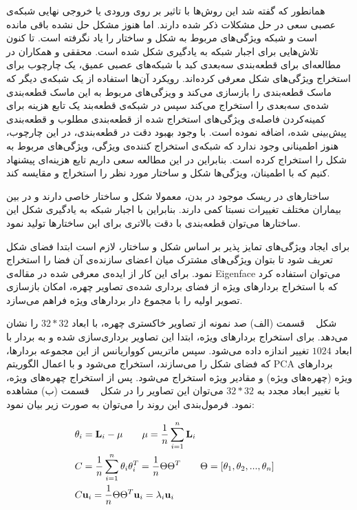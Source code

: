همانطور که گفته شد این روش‌ها با تاثیر بر روی ورودی یا خروجی نهایی شبکه‌ی عصبی سعی در حل مشکلات ذکر شده دارند. اما هنوز مشکل حل نشده باقی مانده است و شبکه ویژگی‌های مربوط به شکل و ساختار را یاد نگرفته است. تا کنون تلاش‌هایی برای اجبار شبکه به یادگیری شکل شده است. محققی و همکاران  در مطالعه‌ای برای قطعه‌بندی سه‌بعدی کبد با شبکه‌های عصبی عمیق، یک چارچوب برای استخراج ویژگی‌های شکل معرفی کرده‌اند. رویکرد آن‌ها استفاده از یک شبکه‌ی دیگر که ماسک قطعه‌بندی را بازسازی می‌کند و ویزگی‌های مربوط به این ماسک قطعه‌بندی شده‌ی سه‌بعدی را استخراج می‌کند سپس در شبکه‌ی قطعه‌بند یک تابع هزینه برای کمینه‌کردن فاصله‌ی ویژگی‌های استخراج شده از قطعه‌بندی مطلوب و قطعه‌بندی پیش‌بینی شده، اضافه نموده است. با وجود بهبود دقت در قطعه‌بندی، در این چارچوب، هنوز اطمینانی وجود ندارد که شبکه‌ی استخراج کننده‌ی ویژگی، ویژگی‌های مربوط به شکل را استخراج کرده است. بنابراین در این مطالعه سعی داریم تایع هزینه‌ای پیشنهاد کنیم که با اطمینان، ویژگی‌ها شکل و ساختار مورد نظر را استخراج و مقایسه کند.

ساختارهای در ریسک موجود در بدن، معمولا شکل و ساختار خاصی دارند و در بین بیماران مختلف تغییرات نسبتا کمی دارند. بنابراین با اجبار شبکه به یادگیری شکل این ساختارها می‌توان قطعه‌بندی با دقت بالاتری برای این ساختارها تولید نمود. 


برای ایجاد ویژگی‌های تمایز پذیر بر اساس شکل و ساختار، لازم است ابتدا فضای شکل تعریف شود تا بتوان ویژگی‌های مشترک میان اعضای سازنده‌ی آن فضا را استخراج نمود. برای این کار از ایده‌ی معرفی شده در مقاله‌ی Eigenface  می‌توان استفاده کرد که با استخراج بردارهای ویژه از فضای برداری شده‌ی تصاویر چهره، امکان بازسازی تصویر اولیه را با مجموع ‌‌دار بردارهای ویژه فراهم می‌سازد. 

شکل ~ قسمت (الف) صد نمونه از تصاویر خاکستری چهره، با ابعاد $32*32$ را نشان می‌دهد. برای استخراج بردارهای ویژه، ابتدا این تصاویر برداری‌سازی شده و به بردار با ابعاد $1024$ تغییر اندازه داده می‌شود. سپس ماتریس کوواریانس از این مجموعه بردارها، که فضای شکل  را می‌سازند، استخراج می‌شود و با اعمال الگوریتم PCA    بردارهای ویژه (چهره‌های ویژه) و مقادیر ویژه استخراج می‌شود. پس از استخراج چهره‌های ویژه، با تغییر ابعاد مجدد به $32*32$ می‌توان این تصاویر را در شکل ~ قسمت (ب) مشاهده نمود. فرمول‌بندی این روند را می‌توان به صورت زیر بیان نمود:

\begin{alignat}{5}
	&\mathbf{\theta}_i =  \mathbf{L}_i - \mathbf{\mu} \qquad  \mathbf{\mu} = \frac{1}{n}\sum_{i=1}^{n} \mathbf{L}_i \notag && \\
	&C = \frac{1}{n}\sum_{i=1}^{n}\mathbf{\theta}_i\mathbf{\theta}_i^{T} = \frac{1}{n}\Theta\Theta^T \qquad   \Theta = [\theta_1, \theta_2, ..., \theta_n]\notag && \\
	&C\mathbf{u}_i = \frac{1}{n}\Theta\Theta^T\mathbf{u}_i=\lambda_i\mathbf{u}_i \label{eigenvecdecomp} &&
\end{alignat}

